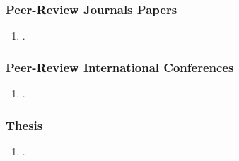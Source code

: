 \begin{publication}

\subsubsection*{Peer-Review Journals Papers}

\begin{enumerate}\scriptsize
\item .
\end{enumerate}

\subsubsection*{Peer-Review International Conferences}

\begin{enumerate}\scriptsize
\item .
\end{enumerate}

\subsubsection*{Thesis}

\begin{enumerate}\scriptsize
\item .
\end{enumerate}

\end{publication}
